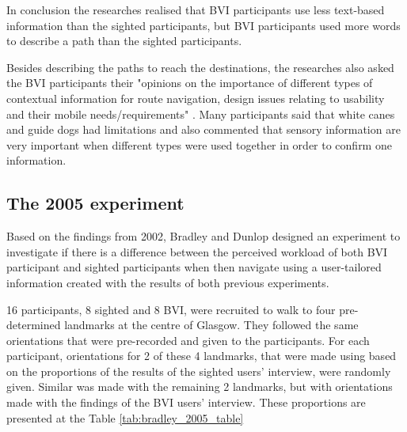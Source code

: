 



In conclusion the researches realised that BVI participants use less text-based information than the sighted participants, but BVI participants used more words to describe a path than the sighted participants.

Besides describing the paths to reach the destinations, the researches also asked the BVI participants their "opinions on the importance of different types of contextual information for route navigation, design issues relating to usability and their mobile needs/requirements" \cite{bradley2002investigating}. Many participants said that white canes and guide dogs had limitations and also commented that sensory information are very important when different types were used together in order to confirm one information. 

\subsection{The 2005 experiment}

Based on the findings from 2002, Bradley and Dunlop designed an experiment to investigate if there is a difference between the perceived workload of both BVI participant and sighted participants when then navigate using a user-tailored information created with the results of both previous experiments.

16 participants, 8 sighted and 8 BVI, were recruited to walk to four pre-determined landmarks at the centre of Glasgow. They followed the same orientations that were pre-recorded and given to the participants. For each participant, orientations for 2 of these 4 landmarks, that were made using based on the proportions of the results of the sighted users' interview, were randomly given. Similar was made with the remaining 2 landmarks, but with orientations made with the findings of the BVI users' interview. These proportions are presented at the Table \ref{tab:bradley_2005_table}

